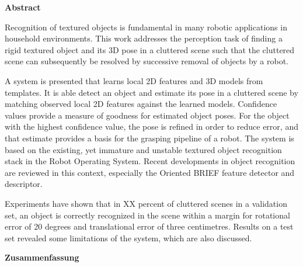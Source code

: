 

\clearemptydoublepage
{}
{}	

\vspace*{2cm}
\begin{center}
{\Large \bf Abstract}
\end{center}
\vspace{1cm}

Recognition of textured objects is fundamental in many robotic applications in
household environments. This work addresses the perception task of finding a
rigid textured object and its 3D pose in a cluttered scene such that the
cluttered scene can subsequently be resolved by successive removal of objects
by a robot.

A system is presented that learns local 2D features and 3D models from
templates. It is able detect an object and estimate its pose in a cluttered
scene by matching observed local 2D features against the learned models.
Confidence values provide a measure of goodness for estimated object poses. For
the object with the highest confidence value, the pose is refined in order to
reduce error, and that estimate provides a basis for the grasping pipeline of a
robot.  The system is based on the existing, yet immature and unstable textured
object recognition stack in the Robot Operating System. Recent developments in
object recognition are reviewed in this context, especially the Oriented BRIEF
feature detector and descriptor.

Experiments have shown that in XX percent of cluttered scenes in a validation
set, an object is correctly recognized in the scene within a margin for
rotational error of 20 degrees and translational error of three centimetres.
Results on a test set revealed some limitations of the system, which are also
discussed.

\clearemptydoublepage
{}
{}

\vspace*{2cm}
\begin{center}
{\Large \bf Zusammenfassung}
\end{center}
\vspace{1cm}



